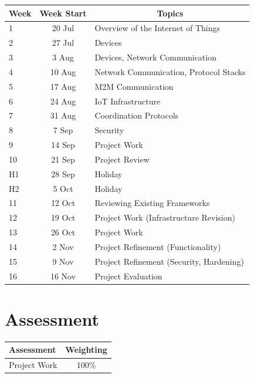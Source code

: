 \documentclass{article}
\begin{document}
\renewcommand{\arraystretch}{1.5}
\begin{tabular}{|l|c|l|}
\hline
 Week & Week Start & \multicolumn{1}{c|}{Topics}             \\ \hline
 1    & 20 Jul     & Overview of the Internet of Things      \\ \hline
 2    & 27 Jul     & Devices                                 \\ \hline
 3    &  3 Aug     & Devices, Network Communication          \\ \hline
 4    & 10 Aug     & Network Communication, Protocol Stacks  \\ \hline
 5    & 17 Aug     & M2M Communication                       \\ \hline
 6    & 24 Aug     & IoT Infrastructure                      \\ \hline
 7    & 31 Aug     & Coordination Protocols                  \\ \hline
 8    &  7 Sep     & Security               		         \\ \hline
 9    & 14 Sep     & Project Work                            \\ \hline
 10   & 21 Sep     & Project Review                          \\ \hline
 H1   & 28 Sep     & Holiday                                 \\ \hline
 H2   &  5 Oct     & Holiday                                 \\ \hline
 11   & 12 Oct     & Reviewing Existing Frameworks  		 \\ \hline
 12   & 19 Oct     & Project Work (Infrastructure Revision)  \\ \hline
 13   & 26 Oct     & Project Work							 \\ \hline
 14   &  2 Nov     & Project Refinement (Functionality)      \\ \hline
 15   &  9 Nov     & Project Refinement (Security, Hardening)\\ \hline
 16   & 16 Nov     & Project Evaluation 					 \\ \hline
\end{tabular}

\section*{Assessment}

\begin{tabular}{|l|c|}
\hline
Assessment                  &  Weighting \\ \hline
Project Work                &  100\% \\ \hline
\end{tabular}
\end{document}

